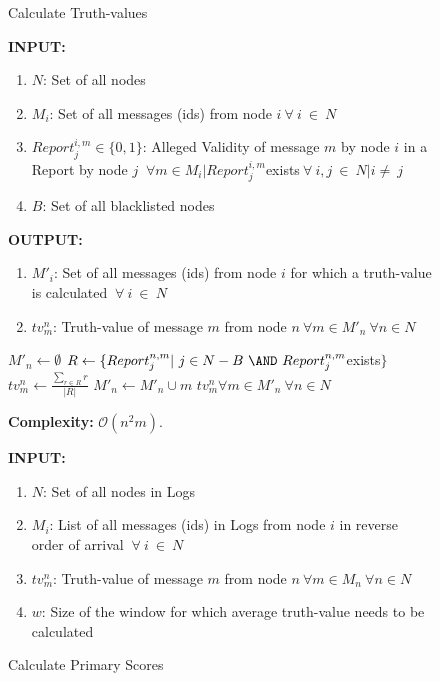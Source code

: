 \documentclass[journal]{IEEEtran}
\makeatletter
\newcommand{\removelatexerror}{\let\@latex@error\@gobble}
\makeatother
\begin{document}
\begin{figure}[!t]\removelatexerror
	\label{fig:ALG_PSCalc}
\begin{algorithm}[H]
	\caption{Calculate Truth-values}
	\label{algo:TVCalc}
	\textbf{INPUT:}
		\begin{enumerate}
		\item $ N $: Set of all nodes
		\item $ M_i $: Set of all messages (ids) from node $ i\ \forall\ i\ \in\ N$
		\item $ Report^{i,m}_j \in\{0,1\}$: Alleged Validity of message $ m $ by node $ i $ in a Report by node $ j $ $\ \forall m\in M_i|Report^{i,m}_j $exists$\ \forall\ i,j\ \in\ N | i\neq\ j $
		\item $B$: Set of all blacklisted nodes
		\end{enumerate}
	\textbf{OUTPUT:}
		\begin{enumerate}
			\item $ M'_i $: Set of all messages (ids) from node $ i $ for which a truth-value is calculated $\ \forall\ i\ \in\ N$
			\item $ tv^n_m $: Truth-value of message $ m $ from node $n\ \forall m\in M'_n\ \forall n\in N$
		\end{enumerate} 
	\begin{algorithmic}[1]
			\STATE $ M'_n \leftarrow \emptyset $
				\STATE $ R \leftarrow\{Report^{n,m}_j|\ j\in N-B\ \AND\ Report^{n,m}_j$exists$ \} $
					\STATE $ tv^n_m \leftarrow \frac{\sum_{r\in R}r}{|R|} $
					\STATE $ M'_n \leftarrow M'_n \cup {m} $
				\ENDIF
			\ENDFOR
		\ENDFOR
	\RETURN $  tv^n_m \forall m\in M'_n\ \forall n\in N $
	\end{algorithmic}
	\textbf{Complexity:} $\mathcal{O}(n^2m)$.
\end{algorithm}
\begin{algorithm}[H]
	\caption{Calculate Primary Scores}
	\label{algo:PSCalc}
	\textbf{INPUT:}
	\begin{enumerate}
		\item $ N $: Set of all nodes in Logs
		\item $ M_i $: List of all messages (ids) in Logs from node $ i $ in reverse order of arrival $\ \forall\ i\ \in\ N$ 
		\item $ tv^n_m $: Truth-value of message $ m $ from node $n\ \forall m\in M_n\ \forall n\in N$
		\item $ w $: Size of the window for which average truth-value needs to be calculated

\end{enumerate}
\end{algorithm}
\end{figure}
\end{document}

